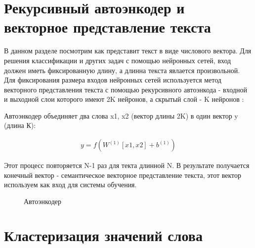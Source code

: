 \documentclass[12pt]{article}
\begin{document}
\section{Рекурсивный автоэнкодер и векторное представление текста}

В данном разделе посмотрим как представит текст в виде числового вектора. Для решения классификации и других задач с помощью нейронных сетей, вход должен иметь фиксированную длину, а длинна текста явлается произвольной. Для фиксирования размера входов нейронных сетей используется метод векторного представления текста с помощью рекурсивного автоэнкода - входной и выходной слои которого имеют 2K нейронов, а скрытый слой - K нейронов \cite{Socher2}: 

Автоэнкодер объединяет два слова x1, x2 (вектор длины 2K) в один вектор y (длина К):

  \begin{align}
	y=f{(W^{(1)}[x1, x2] + b^{(1)})}
  \end{align}

Этот процесс повторяется N-1 раз для текта длинной N. В результате получается конечный вектор - семантическое векторное представление текста, этот вектор используем как вход для системы обучения.

  \begin{figure}[H]
    \noindent{}
    \caption{Автоэнкодер}
    \label{figCurves}
  \end{figure}

\section{Кластеризация значений слова}
\end{document}
